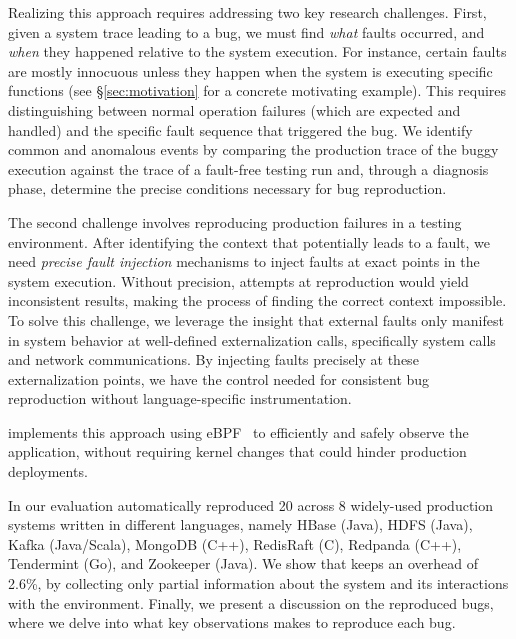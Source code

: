 Realizing this approach requires addressing two key research challenges.
First, given a system trace leading to a bug, we must find \emph{what} faults occurred, and \emph{when} they happened relative to the system execution.
For instance, certain faults are mostly innocuous unless they happen when the system is executing specific functions (see \S\ref{sec:motivation} for a concrete motivating example).  
This requires distinguishing between normal operation failures (which are expected and handled) and the specific fault sequence that triggered the bug.
We identify common and anomalous events by comparing the production trace of the buggy execution against the trace of a fault-free testing run and, through a diagnosis phase, determine the precise conditions necessary for bug reproduction.

The second challenge involves reproducing production failures in a testing environment. 
After identifying the context that potentially leads to a fault, we need \emph{precise fault injection} mechanisms to inject faults at exact points in the system execution.
Without precision, attempts at reproduction would yield inconsistent results, making the process of finding the correct context impossible.
To solve this challenge, we leverage the insight that external faults only manifest in system behavior at well-defined externalization calls, specifically system calls and network communications.
By injecting faults precisely at these externalization points, we have the control needed for consistent bug reproduction without language-specific instrumentation.

\sys implements this approach using eBPF~\cite{ebpf} to efficiently and safely observe the application, without requiring kernel changes that could hinder production deployments. 

In our evaluation \sys automatically reproduced 20 \efibshort across 8 widely-used production systems written in different languages, namely  HBase (Java), HDFS (Java), Kafka (Java/Scala), MongoDB (C++), RedisRaft (C), Redpanda (C++), Tendermint (Go),  and Zookeeper (Java).
We show that \sys keeps an overhead of 2.6\%, by collecting only partial information about the system and its interactions with the environment.
Finally, we present a discussion on the reproduced bugs, where we delve into what key observations \sys makes to reproduce each bug.


